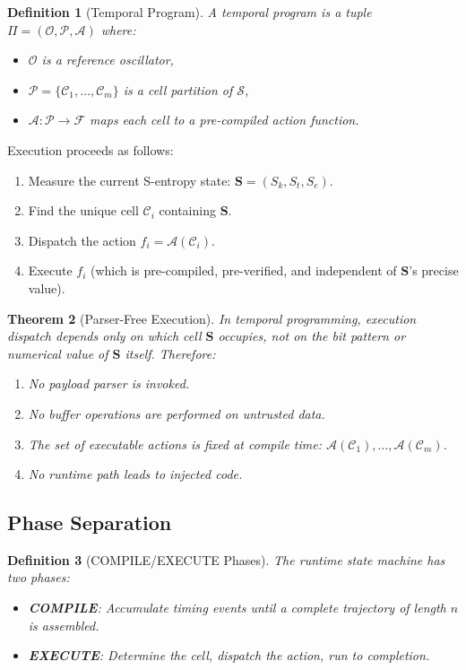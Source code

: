 \documentclass[twocolumn,11pt,a4paper]{article}
\newtheorem{theorem}{Theorem}[section]
\newtheorem{definition}[theorem]{Definition}
\newcommand{\Sk}{S_{k}}
\newcommand{\St}{S_{t}}
\newcommand{\Se}{S_{e}}
\newcommand{\Stuple}{\mathbf{S}}
\newcommand{\OOsc}{\mathcal{O}}
\newcommand{\calC}{\mathcal{C}}
\newcommand{\calP}{\mathcal{P}}
\newcommand{\calS}{\mathcal{S}}
\begin{document}
\begin{definition}[Temporal Program]
A \emph{temporal program} is a tuple $\Pi = (\OOsc, \calP, \mathcal{A})$ where:
\begin{itemize}[nosep,leftmargin=1em]
  \item $\OOsc$ is a reference oscillator,
  \item $\calP = \{\calC_1, \ldots, \calC_m\}$ is a cell partition of $\calS$,
  \item $\mathcal{A}: \calP \to \mathcal{F}$ maps each cell to a pre-compiled action function.
\end{itemize}
\end{definition}

Execution proceeds as follows:
\begin{enumerate}[nosep]
  \item Measure the current S-entropy state: $\Stuple = (\Sk, \St, \Se)$.
  \item Find the unique cell $\calC_i$ containing $\Stuple$.
  \item Dispatch the action $f_i = \mathcal{A}(\calC_i)$.
  \item Execute $f_i$ (which is pre-compiled, pre-verified, and independent of $\Stuple$'s precise value).
\end{enumerate}

\begin{theorem}[Parser-Free Execution]
In temporal programming, execution dispatch depends only on which cell $\Stuple$ occupies, not on the bit pattern or numerical value of $\Stuple$ itself. Therefore:
\begin{enumerate}[nosep,label=(\roman*)]
  \item No payload parser is invoked.
  \item No buffer operations are performed on untrusted data.
  \item The set of executable actions is fixed at compile time: $\mathcal{A}(\calC_1), \ldots, \mathcal{A}(\calC_m)$.
  \item No runtime path leads to injected code.
\end{enumerate}
\end{theorem}

\subsection{Phase Separation}

\begin{definition}[COMPILE/EXECUTE Phases]
The runtime state machine has two phases:
\begin{itemize}[nosep,leftmargin=1em]
  \item \textbf{COMPILE}: Accumulate timing events until a complete trajectory of length $n$ is assembled.
  \item \textbf{EXECUTE}: Determine the cell, dispatch the action, run to completion.
\end{itemize}
\end{definition}
\end{document}
